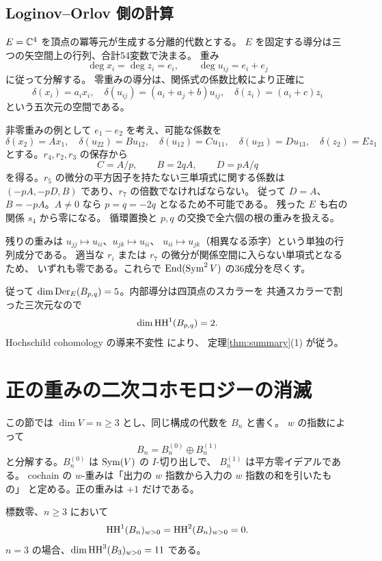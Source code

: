 \subsection{Loginov--Orlov 側の計算}
$E=\mathbb C^4$ を頂点の冪等元が生成する分離的代数とする。
$E$ を固定する導分は三つの矢空間上の行列、合計54変数で決まる。
重み
\[
 \deg x_i=\deg z_i=e_i,\qquad\deg u_{ij}=e_i+e_j
\]
に従って分解する。
零重みの導分は、関係式の係数比較により正確に
\begin{equation}\label{eq:derlo}
 \delta(x_i)=a_i x_i,\quad
 \delta(u_{ij})=(a_i+a_j+b)u_{ij},\quad
 \delta(z_i)=(a_i+c)z_i
\end{equation}
という五次元の空間である。

非零重みの例として $e_1-e_2$ を考え、可能な係数を
\[
 \delta(x_2)=Ax_1,\quad\delta(u_{22})=Bu_{12},\quad
 \delta(u_{12})=Cu_{11},\quad\delta(u_{23})=Du_{13},\quad
 \delta(z_2)=Ez_1
\]
とする。$r_4,r_2,r_3$ の保存から
\[
 C=A/p,\qquad B=2qA,\qquad D=pA/q
\]
を得る。$r_5$ の微分の平方因子を持たない三単項式に関する係数は
$(-pA,-pD,B)$ であり、$r_7$ の倍数でなければならない。
従って $D=A$、$B=-pA$。$A\ne0$ なら $p=q=-2q$ となるため不可能である。
残った $E$ も右の関係 $s_4$ から零になる。
循環置換と $p,q$ の交換で全六個の根の重みを扱える。

残りの重みは $u_{jj}\mapsto u_{ii}$、$u_{jk}\mapsto u_{ii}$、
$u_{ii}\mapsto u_{jk}$（相異なる添字）という単独の行列成分である。
適当な $r_i$ または $r_7$ の微分が関係空間に入らない単項式となるため、
いずれも零である。これらで $\operatorname{End}(\operatorname{Sym}^2V)$ の36成分を尽くす。

従って $\dim\operatorname{Der}_E(B_{p,q})=5$。内部導分は四頂点のスカラーを
共通スカラーで割った三次元なので
\[
 \dim\operatorname{HH}^1(B_{p,q})=2.
\]
Hochschild cohomology の導来不変性 \cite{Keller} により、
定理\ref{thm:summary}(1) が従う。

\section{正の重みの二次コホモロジーの消滅}\label{sec:vanish}
この節では $\dim V=n\ge3$ とし、同じ構成の代数を $B_n$ と書く。
$w$ の指数によって
\[
 B_n=B_n^{(0)}\oplus B_n^{(1)}
\]
と分解する。$B_n^{(0)}$ は $\operatorname{Sym}(V)$ の $I$-切り出しで、
$B_n^{(1)}$ は平方零イデアルである。
cochain の $w$-重みは「出力の $w$ 指数から入力の $w$ 指数の和を引いたもの」
と定める。正の重みは $+1$ だけである。

\begin{theorem}\label{thm:positive}
標数零、$n\ge3$ において
\[
 \operatorname{HH}^1(B_n)_{w>0}=\operatorname{HH}^2(B_n)_{w>0}=0.
\]
$n=3$ の場合、$\dim\operatorname{HH}^3(B_3)_{w>0}=11$ である。
\end{theorem}

